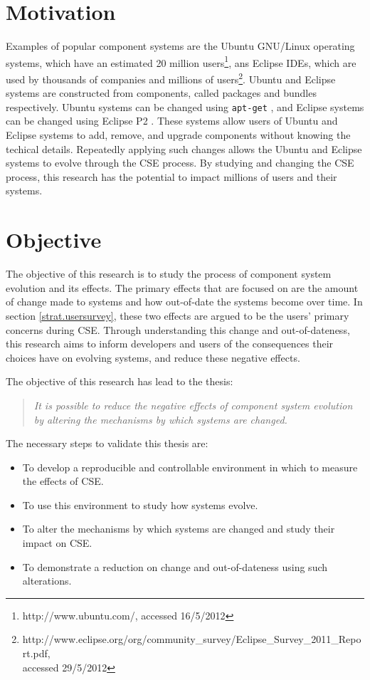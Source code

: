 \section{Motivation}
Examples of popular component systems are the Ubuntu GNU/Linux operating systems, which have an estimated 20 million users\footnote{http://www.ubuntu.com/, accessed 16/5/2012},
ans Eclipse IDEs, which are used by thousands of companies and millions of users\footnote{http://www.eclipse.org/org/community\_survey/Eclipse\_Survey\_2011\_Report.pdf, \\accessed 29/5/2012}.
Ubuntu and Eclipse systems are constructed from components, called packages and bundles respectively. 
Ubuntu systems can be changed using \texttt{apt-get} \citep{Barth2005}, and Eclipse systems can be changed using Eclipse P2 \citep{leBerre2010}.
These systems allow users of Ubuntu and Eclipse systems to add, remove, and upgrade components without knowing the techical details.
Repeatedly applying such changes allows the Ubuntu and Eclipse systems to evolve through the CSE process.
By studying and changing the CSE process,
this research has the potential to impact millions of users and their systems.

\section{Objective}
The objective of this research is to study the process of component system evolution and its effects.
The primary effects that are focused on are the amount of change made to systems and how out-of-date the systems become over time.
In section \ref{strat.usersurvey}, these two effects are argued to be the users' primary concerns during CSE.
Through understanding this change and out-of-dateness,
this research aims to inform developers and users of the consequences their choices have on evolving systems,
and reduce these negative effects.

The objective of this research has lead to the thesis:
\begin{quote}
\textit{It is possible to reduce the negative effects of component system evolution by altering the mechanisms by which systems are changed.} 
\end{quote}

The necessary steps to validate this thesis are:
\begin{itemize}
  \item To develop a reproducible and controllable environment in which to measure the effects of CSE.
  \item To use this environment to study how systems evolve.
  \item To alter the mechanisms by which systems are changed and study their impact on CSE.
  \item To demonstrate a reduction on change and out-of-dateness using such alterations.
\end{itemize}

